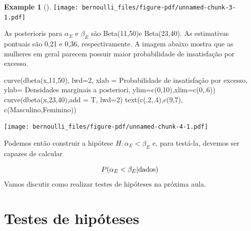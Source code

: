 \documentclass[
  letterpaper,
  DIV=11,
  numbers=noendperiod]{scrreprt}
\newenvironment{Shaded}{\begin{snugshade}}{\end{snugshade}}
\newcommand{\AttributeTok}[1]{\textcolor[rgb]{0.40,0.45,0.13}{#1}}
\newcommand{\DecValTok}[1]{\textcolor[rgb]{0.68,0.00,0.00}{#1}}
\newcommand{\FunctionTok}[1]{\textcolor[rgb]{0.28,0.35,0.67}{#1}}
\newcommand{\NormalTok}[1]{\textcolor[rgb]{0.00,0.23,0.31}{#1}}
\newcommand{\StringTok}[1]{\textcolor[rgb]{0.13,0.47,0.30}{#1}}
\theoremstyle{plain}
\theoremstyle{definition}
\newtheorem{example}{Example}[chapter]
\theoremstyle{definition}
\theoremstyle{remark}
\begin{document}
\begin{example}[]
\texttt{[image: bernoulli\_files/figure-pdf/unnamed-chunk-3-1.pdf]}

As posterioris para \(\alpha_E\) e \(\beta_E\) são Beta(11,50)e
Beta(23,40). As estimativas pontuais são 0,21 e 0,36, respectivamente. A
imagem abaixo mostra que as mulheres em geral parecem possuir maior
probabilidade de insatisfação por excesso.

\begin{Shaded}
\begin{Highlighting}[]
\FunctionTok{curve}\NormalTok{(}\FunctionTok{dbeta}\NormalTok{(x,}\DecValTok{11}\NormalTok{,}\DecValTok{50}\NormalTok{), }\AttributeTok{lwd=}\DecValTok{2}\NormalTok{, }\AttributeTok{xlab =} \StringTok{\textquotesingle{}Probabilidade de insatisfação por excesso\textquotesingle{}}\NormalTok{, }\AttributeTok{ylab=} \StringTok{\textquotesingle{}Densidades marginais a posteriori\textquotesingle{}}\NormalTok{, }\AttributeTok{ylim=}\FunctionTok{c}\NormalTok{(}\DecValTok{0}\NormalTok{,}\DecValTok{10}\NormalTok{),}\AttributeTok{xlim=}\FunctionTok{c}\NormalTok{(}\DecValTok{0}\NormalTok{,.}\DecValTok{6}\NormalTok{))}
\FunctionTok{curve}\NormalTok{(}\FunctionTok{dbeta}\NormalTok{(x,}\DecValTok{23}\NormalTok{,}\DecValTok{40}\NormalTok{),}\AttributeTok{add =}\NormalTok{ T, }\AttributeTok{lwd=}\DecValTok{2}\NormalTok{)}
\FunctionTok{text}\NormalTok{(}\FunctionTok{c}\NormalTok{(.}\DecValTok{2}\NormalTok{,.}\DecValTok{4}\NormalTok{),}\FunctionTok{c}\NormalTok{(}\DecValTok{9}\NormalTok{,}\DecValTok{7}\NormalTok{), }\FunctionTok{c}\NormalTok{(}\StringTok{\textquotesingle{}Masculino\textquotesingle{}}\NormalTok{,}\StringTok{\textquotesingle{}Feminino\textquotesingle{}}\NormalTok{))}
\end{Highlighting}
\end{Shaded}

\texttt{[image: bernoulli\_files/figure-pdf/unnamed-chunk-4-1.pdf]}

Podemos então construir a hipótese \(H:\alpha_E<\beta_E\) e, para
testá-la, devemos ser capazes de calcular

\[P(\alpha_E<\beta_E|\hbox{dados})\] Vamos discutir como realizar testes
de hipóteses na próxima aula.

\end{example}


\chapter{Testes de hipóteses}\label{testes-de-hipuxf3teses}
\end{document}
